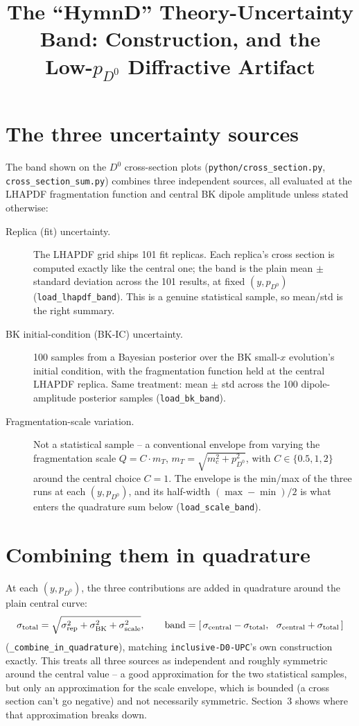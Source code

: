 \documentclass[11pt]{article}
\title{The ``HymnD'' Theory-Uncertainty Band: Construction, and the\\
Low-$p_{D^0}$ Diffractive Artifact}
\author{}
\date{}
\begin{document}
\maketitle

\section{The three uncertainty sources}

The band shown on the $D^0$ cross-section plots (\texttt{python/cross\_section.py},
\texttt{cross\_section\_sum.py}) combines three independent sources, all evaluated
at the LHAPDF fragmentation function and central BK dipole amplitude unless
stated otherwise:

\begin{description}
\item[Replica (fit) uncertainty.] The LHAPDF grid ships 101 fit replicas.
Each replica's cross section is computed exactly like the central one; the
band is the plain mean $\pm$ standard deviation across the 101 results, at
fixed $(y,p_{D^0})$ (\texttt{load\_lhapdf\_band}). This is a genuine
statistical sample, so mean/std is the right summary.
\item[BK initial-condition (BK-IC) uncertainty.] 100 samples from a
Bayesian posterior over the BK small-$x$ evolution's initial condition,
with the fragmentation function held at the central LHAPDF replica. Same
treatment: mean $\pm$ std across the 100 dipole-amplitude posterior samples
(\texttt{load\_bk\_band}).
\item[Fragmentation-scale variation.] Not a statistical sample -- a
conventional envelope from varying the fragmentation scale
$Q=C\cdot m_T$, $m_T=\sqrt{m_c^2+p_{D^0}^2}$, with $C\in\{0.5,1,2\}$ around
the central choice $C=1$. The envelope is the min/max of the three runs at
each $(y,p_{D^0})$, and its half-width $(\max-\min)/2$ is what enters the
quadrature sum below (\texttt{load\_scale\_band}).
\end{description}

\section{Combining them in quadrature}

At each $(y,p_{D^0})$, the three contributions are added in quadrature
around the plain central curve:
\[
\sigma_{\rm total} = \sqrt{\sigma_{\rm rep}^2+\sigma_{\rm BK}^2+\sigma_{\rm scale}^2},
\qquad
\text{band} = [\,\sigma_{\rm central}-\sigma_{\rm total},\ \ \sigma_{\rm central}+\sigma_{\rm total}\,]
\]
(\texttt{\_combine\_in\_quadrature}), matching \texttt{inclusive-D0-UPC}'s own
construction exactly. This treats all three sources as independent and
roughly symmetric around the central value -- a good approximation for the
two statistical samples, but only an approximation for the scale envelope,
which is bounded (a cross section can't go negative) and not necessarily
symmetric. Section~3 shows where that approximation breaks down.
\end{document}
